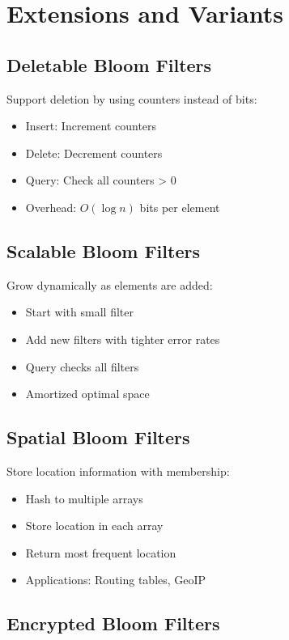 \documentclass[11pt]{article}
\begin{document}
\section{Extensions and Variants}

\subsection{Deletable Bloom Filters}

Support deletion by using counters instead of bits:
\begin{itemize}
\item Insert: Increment counters
\item Delete: Decrement counters
\item Query: Check all counters > 0
\item Overhead: $O(\log n)$ bits per element
\end{itemize}

\subsection{Scalable Bloom Filters}

Grow dynamically as elements are added:
\begin{itemize}
\item Start with small filter
\item Add new filters with tighter error rates
\item Query checks all filters
\item Amortized optimal space
\end{itemize}

\subsection{Spatial Bloom Filters}

Store location information with membership:
\begin{itemize}
\item Hash to multiple arrays
\item Store location in each array
\item Return most frequent location
\item Applications: Routing tables, GeoIP
\end{itemize}

\subsection{Encrypted Bloom Filters}
\end{document}
